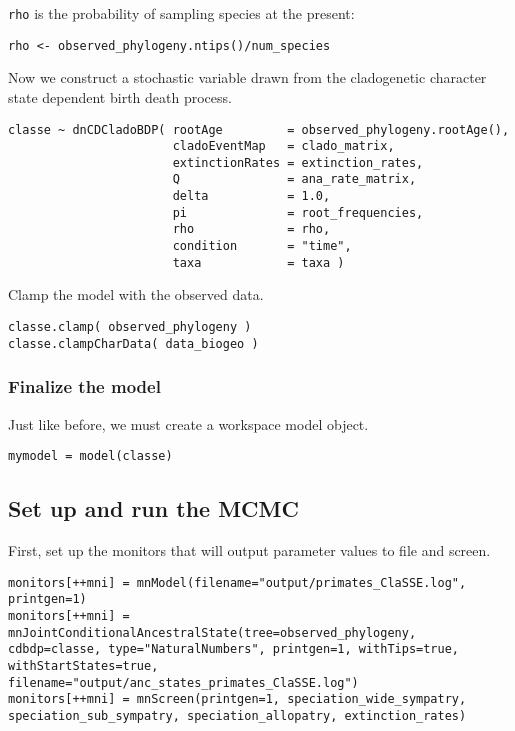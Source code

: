 \texttt{rho} is the probability of sampling species at the present:
{\tt \begin{snugshade*}
\begin{lstlisting}
rho <- observed_phylogeny.ntips()/num_species
\end{lstlisting}
\end{snugshade*}}

Now we construct a stochastic variable drawn from the cladogenetic 
character state dependent birth death process.
{\tt \begin{snugshade*}
\begin{lstlisting}
classe ~ dnCDCladoBDP( rootAge         = observed_phylogeny.rootAge(),
                       cladoEventMap   = clado_matrix,
                       extinctionRates = extinction_rates,
                       Q               = ana_rate_matrix,
                       delta           = 1.0,
                       pi              = root_frequencies,
                       rho             = rho,
                       condition       = "time",
                       taxa            = taxa )
\end{lstlisting}
\end{snugshade*}}

Clamp the model with the observed data.
{\tt \begin{snugshade*}
\begin{lstlisting}
classe.clamp( observed_phylogeny )
classe.clampCharData( data_biogeo )
\end{lstlisting}
\end{snugshade*}}

\subsubsection{Finalize the model}

Just like before, we must create a workspace model object.
{\tt \begin{snugshade*}
\begin{lstlisting}
mymodel = model(classe)
\end{lstlisting}
\end{snugshade*}}

\subsection{Set up and run the MCMC}

First, set up the monitors that will output parameter values to file and screen.
{\tt \begin{snugshade*}
\begin{lstlisting}
monitors[++mni] = mnModel(filename="output/primates_ClaSSE.log", printgen=1)
monitors[++mni] = mnJointConditionalAncestralState(tree=observed_phylogeny, cdbdp=classe, type="NaturalNumbers", printgen=1, withTips=true, withStartStates=true, filename="output/anc_states_primates_ClaSSE.log")
monitors[++mni] = mnScreen(printgen=1, speciation_wide_sympatry, speciation_sub_sympatry, speciation_allopatry, extinction_rates)
\end{lstlisting}
\end{snugshade*}}

